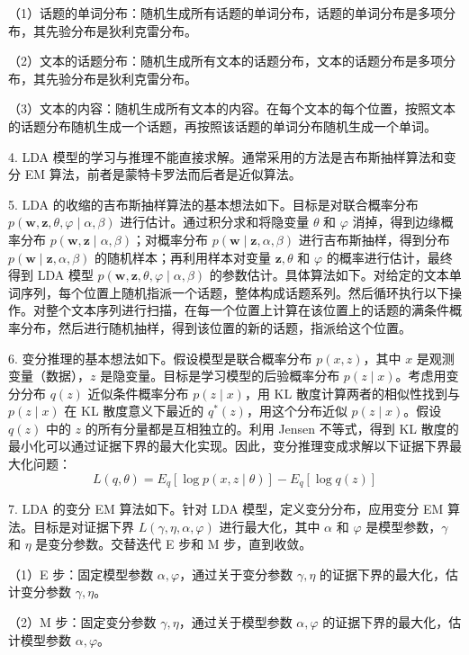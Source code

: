 \documentclass[UTF8, 12pt, fontset=fandol, oneside]{ctexart}
\begin{document}
（1）话题的单词分布：随机生成所有话题的单词分布，话题的单词分布是多项分布，其先验分布是狄利克雷分布。

（2）文本的话题分布：随机生成所有文本的话题分布，文本的话题分布是多项分布，其先验分布是狄利克雷分布。

（3）文本的内容：随机生成所有文本的内容。在每个文本的每个位置，按照文本的话题分布随机生成一个话题，再按照该话题的单词分布随机生成一个单词。

4. LDA 模型的学习与推理不能直接求解。通常采用的方法是吉布斯抽样算法和变分 EM 算法，前者是蒙特卡罗法而后者是近似算法。

5. LDA 的收缩的吉布斯抽样算法的基本想法如下。目标是对联合概率分布 $p(\mathbf{w},\mathbf{z},\theta,\varphi\mid\alpha,\beta)$ 进行估计。通过积分求和将隐变量 $\theta$ 和 $\varphi$ 消掉，得到边缘概率分布 $p(\mathbf{w},\mathbf{z}\mid\alpha,\beta)$；对概率分布 $p(\mathbf{w}\mid\mathbf{z},\alpha,\beta)$ 进行吉布斯抽样，得到分布 $p(\mathbf{w}\mid\mathbf{z},\alpha,\beta)$ 的随机样本；再利用样本对变量 $\mathbf{z},\theta$ 和 $\varphi$ 的概率进行估计，最终得到 LDA 模型 $p(\mathbf{w},\mathbf{z},\theta,\varphi\mid\alpha,\beta)$ 的参数估计。具体算法如下。对给定的文本单词序列，每个位置上随机指派一个话题，整体构成话题系列。然后循环执行以下操作。对整个文本序列进行扫描，在每一个位置上计算在该位置上的话题的满条件概率分布，然后进行随机抽样，得到该位置的新的话题，指派给这个位置。

6. 变分推理的基本想法如下。假设模型是联合概率分布 $p(x,z)$，其中 $x$ 是观测变量（数据），$z$ 是隐变量。目标是学习模型的后验概率分布 $p(z\mid x)$。考虑用变分分布 $q(z)$ 近似条件概率分布 $p(z\mid x)$，用 KL 散度计算两者的相似性找到与 $p(z\mid x)$ 在 KL 散度意义下最近的 $q^*(z)$，用这个分布近似 $p(z\mid x)$。假设 $q(z)$ 中的 $z$ 的所有分量都是互相独立的。利用 Jensen 不等式，得到 KL 散度的最小化可以通过证据下界的最大化实现。因此，变分推理变成求解以下证据下界最大化问题：
\[
L(q,\theta)=E_q[\log p(x,z\mid\theta)]-E_q[\log q(z)]
\]

7. LDA 的变分 EM 算法如下。针对 LDA 模型，定义变分分布，应用变分 EM 算法。目标是对证据下界 $L(\gamma,\eta,\alpha,\varphi)$ 进行最大化，其中 $\alpha$ 和 $\varphi$ 是模型参数，$\gamma$ 和 $\eta$ 是变分参数。交替迭代 E 步和 M 步，直到收敛。

（1）E 步：固定模型参数 $\alpha,\varphi$，通过关于变分参数 $\gamma,\eta$ 的证据下界的最大化，估计变分参数 $\gamma,\eta$。

（2）M 步：固定变分参数 $\gamma,\eta$，通过关于模型参数 $\alpha,\varphi$ 的证据下界的最大化，估计模型参数 $\alpha,\varphi$。
\end{document}
